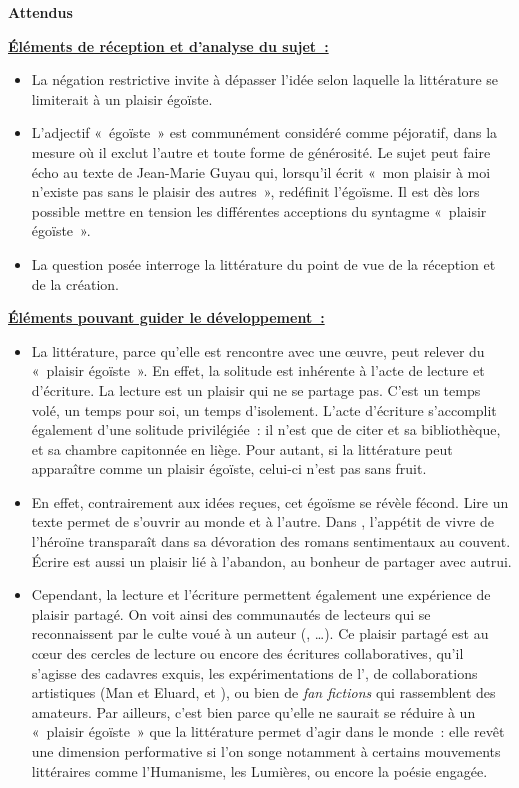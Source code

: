 {\textbf{Attendus}

\textbf{\underline{Éléments de réception et d'analyse du sujet~:}}

\begin{itemize}
\item La négation restrictive invite à dépasser l'idée selon laquelle la littérature se
limiterait à un plaisir égoïste.
\item L'adjectif «~égoïste~» est communément considéré comme péjoratif, dans la
mesure où il exclut l'autre et toute forme de générosité. Le sujet peut faire écho
au texte de Jean-Marie Guyau qui, lorsqu'il écrit «~mon plaisir à moi n'existe pas
sans le plaisir des autres~», redéfinit l'égoïsme. Il est dès lors possible mettre
en tension les différentes acceptions du syntagme «~plaisir égoïste~».
\item La question posée interroge la littérature du point de vue de la réception et de
la création.
\end{itemize}

\textbf{\underline{Éléments pouvant guider le développement~:}}
\begin{itemize}
\item La littérature, parce qu'elle est rencontre avec une œuvre, peut relever du «~plaisir
égoïste~». En effet, la solitude est inhérente à l'acte de lecture et d'écriture. La lecture
est un plaisir qui ne se partage pas. C'est un temps volé, un temps pour soi, un temps
d'isolement. L'acte d'écriture s'accomplit également d'une solitude privilégiée~: il n'est
que de citer  et sa bibliothèque,  et sa chambre capitonnée en liège.
Pour autant, si la littérature peut apparaître comme un plaisir égoïste, celui-ci n'est pas
sans fruit.
\item En effet, contrairement aux idées reçues, cet égoïsme se révèle fécond. Lire un texte
permet de s'ouvrir au monde et à l'autre. Dans , l'appétit de vivre de
l'héroïne transparaît dans sa dévoration des romans sentimentaux au couvent. Écrire
est aussi un plaisir lié à l'abandon, au bonheur de partager avec autrui.
\item Cependant, la lecture et l'écriture permettent également une expérience de plaisir
partagé. On voit ainsi des communautés de lecteurs qui se reconnaissent par le culte
voué à un auteur (, …). Ce plaisir partagé est au cœur des cercles de
lecture ou encore des écritures collaboratives, qu'il s'agisse des cadavres exquis, les
expérimentations de l', de collaborations artistiques (Man  et Eluard,
 et ), ou bien de \textit{fan fictions} qui rassemblent des amateurs. Par
ailleurs, c'est bien parce qu'elle ne saurait se réduire à un «~plaisir égoïste~» que la
littérature permet d'agir dans le monde~: elle revêt une dimension performative si l'on
songe notamment à certains mouvements littéraires comme l'Humanisme, les
Lumières, ou encore la poésie engagée.
\end{itemize}

}
